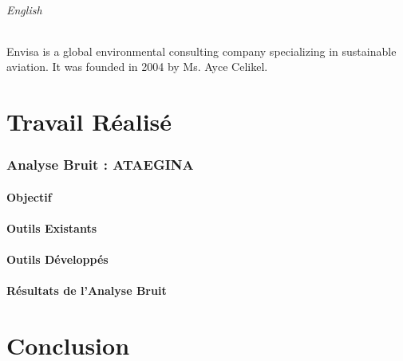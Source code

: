 \documentclass[a4paper]{article}
\begin{document}
    \paragraph{English}
    Envisa is a global environmental consulting company specializing in sustainable aviation. It was founded in 2004 by Ms. Ayce Celikel.
    \newpage
    \part{Travail Réalisé}
    \section{Analyse Bruit : ATAEGINA}
    \subsection{Objectif}
    \subsection{Outils Existants}
    \subsection{Outils Développés}
    \subsection{Résultats de l'Analyse Bruit}
    \newpage
    \part{Conclusion}
\end{document}
